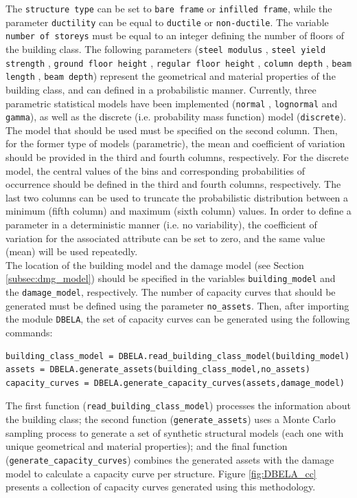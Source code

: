 The \verb=structure type= can be set to \verb=bare frame= or \verb=infilled frame=, while the parameter \verb=ductility= can be equal to \verb=ductile= or \verb=non-ductile=. The variable \verb=number of storeys= must be equal to an integer defining the number of floors of the building class. The following parameters (\verb=steel modulus= , \verb=steel yield strength= , \verb=ground floor height= , \verb=regular floor height= , \verb=column depth= , \verb=beam length= , \verb=beam depth=) represent the geometrical and material properties of the building class, and can defined in a probabilistic manner. Currently, three parametric statistical models have been implemented (\verb=normal= , \verb=lognormal= and \verb=gamma=), as well as the discrete (i.e. probability mass function) model (\verb=discrete=). The model that should be used must be specified on the second column. Then, for the former type of models (parametric), the mean and coefficient of variation should be provided in the third and fourth columns, respectively. For the discrete model, the central values of the bins and corresponding probabilities of occurrence should be defined in the third and fourth columns, respectively. The last two columns can be used to truncate the probabilistic distribution between a minimum (fifth column) and maximum (sixth column) values. In order to define a parameter in a deterministic manner (i.e. no variability), the coefficient of variation for the associated attribute can be set to zero, and the same value (mean) will be used repeatedly.\\

The location of the building model and the damage model (see Section \ref{subsec:dmg_model}) should be specified in the variables \verb=building_model= and the \verb=damage_model=, respectively. The number of capacity curves that should be generated must be defined using the parameter \verb=no_assets=. Then, after importing the module \verb=DBELA=, the set of capacity curves can be generated using the following commands:

\begin{Verbatim}[frame=single, commandchars=\\\{\}, samepage=true]
building_class_model = DBELA.read_building_class_model(building_model)
assets = DBELA.generate_assets(building_class_model,no_assets)
capacity_curves = DBELA.generate_capacity_curves(assets,damage_model)
\end{Verbatim}

The first function (\verb=read_building_class_model=) processes the information about the building class; the second function (\verb=generate_assets=) uses a Monte Carlo sampling process to generate a set of synthetic structural models (each one with unique geometrical and material properties); and the final function (\verb=generate_capacity_curves=) combines the generated assets with the damage model to calculate a capacity curve per structure. Figure \ref{fig:DBELA_cc} presents a collection of capacity curves generated using this methodology.

